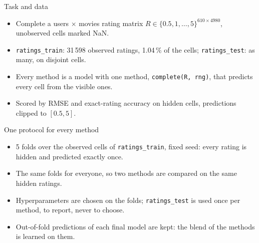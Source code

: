 
\begin{frame}{Task and data}
  \begin{itemize}
    \item Complete a users $\times$ movies rating matrix $R \in \{0.5, 1, \dots, 5\}^{610 \times 4980}$, unobserved cells marked NaN.
    \item \texttt{ratings\_train}: 31\,598 observed ratings, 1.04\,\% of the cells; \texttt{ratings\_test}: as many, on disjoint cells.
    \item Every method is a model with one method, \texttt{complete(R, rng)}, that predicts every cell from the visible ones.
    \item Scored by RMSE and exact-rating accuracy on hidden cells, predictions clipped to $[0.5, 5]$.
  \end{itemize}
\end{frame}

\begin{frame}{One protocol for every method}
  \begin{itemize}
    \item 5 folds over the observed cells of \texttt{ratings\_train}, fixed seed: every rating is hidden and predicted exactly once.
    \item The same folds for everyone, so two methods are compared on the same hidden ratings.
    \item Hyperparameters are chosen on the folds; \texttt{ratings\_test} is used once per method, to report, never to choose.
    \item Out-of-fold predictions of each final model are kept: the blend of the methods is learned on them.
  \end{itemize}
\end{frame}
